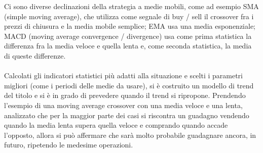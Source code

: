 \documentclass[a4paper,12pt]{report}
\begin{document}
Ci sono diverse declinazioni della strategia a medie mobili, come ad esempio SMA (simple moving average), che utilizza come segnale di buy / sell il crossover fra i prezzi di chiusura e la media mobile semplice; EMA usa una media esponenziale; MACD (moving average convergence / divergence) usa come prima statistica la differenza fra la media veloce e quella lenta e, come seconda statistica, la media di queste differenze.
\\~\\
Calcolati gli indicatori statistici più adatti alla situazione e scelti i parametri migliori (come i periodi delle medie da usare), si è costruito un modello di trend del titolo e si è in grado di prevedere quando il trend si ripropone. Prendendo l'esempio di una moving average crossover con una media veloce e una lenta, analizzato che per la maggior parte dei casi si riscontra un guadagno vendendo quando la media lenta supera quella veloce e comprando quando accade l'opposto, allora si può affermare che sarà molto probabile guadagnare ancora, in futuro, ripetendo le medesime operazioni.
\end{document}
